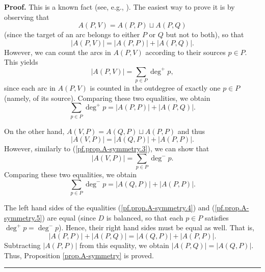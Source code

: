 \documentclass[numbers=enddot,12pt,final,onecolumn,notitlepage]{scrartcl}%
\theoremstyle{definition}
\newenvironment{proof}[1][Proof]{\noindent\textbf{#1.} }{\ \rule{0.5em}{0.5em}}
\let\sumnonlimits\sum
\renewcommand{\sum}{\sumnonlimits\limits}
\theoremstyle{plainsl}
\begin{document}
\begin{proof}
This is a known fact (see, e.g., \cite[Exercise 9.1]{22s}). The easiest way to
prove it is by observing that%
\[
A\left(  P,V\right)  =A\left(  P,P\right)  \sqcup A\left(  P,Q\right)
\]
(since the target of an arc belongs to either $P$ or $Q$ but not to both), so
that%
\[
\left\vert A\left(  P,V\right)  \right\vert =\left\vert A\left(  P,P\right)
\right\vert +\left\vert A\left(  P,Q\right)  \right\vert .
\]
However, we can count the arcs in $A\left(  P,V\right)  $ according to their
sources $p\in P$. This yields%
\begin{equation}
\left\vert A\left(  P,V\right)  \right\vert =\sum_{p\in P}\deg^{+}p,
\label{pf.prop.A-symmetry.3}%
\end{equation}
since each arc in $A\left(  P,V\right)  $ is counted in the outdegree of
exactly one $p\in P$ (namely, of its source). Comparing these two equalities,
we obtain%
\begin{equation}
\sum_{p\in P}\deg^{+}p=\left\vert A\left(  P,P\right)  \right\vert +\left\vert
A\left(  P,Q\right)  \right\vert . \label{pf.prop.A-symmetry.4}%
\end{equation}


On the other hand, $A\left(  V,P\right)  =A\left(  Q,P\right)  \sqcup A\left(
P,P\right)  $ and thus%
\[
\left\vert A\left(  V,P\right)  \right\vert =\left\vert A\left(  Q,P\right)
\right\vert +\left\vert A\left(  P,P\right)  \right\vert .
\]
However, similarly to (\ref{pf.prop.A-symmetry.3}), we can show that%
\[
\left\vert A\left(  V,P\right)  \right\vert =\sum_{p\in P}\deg^{-}p.
\]
Comparing these two equalities, we obtain%
\begin{equation}
\sum_{p\in P}\deg^{-}p=\left\vert A\left(  Q,P\right)  \right\vert +\left\vert
A\left(  P,P\right)  \right\vert . \label{pf.prop.A-symmetry.5}%
\end{equation}


The left hand sides of the equalities (\ref{pf.prop.A-symmetry.4}) and
(\ref{pf.prop.A-symmetry.5}) are equal (since $D$ is balanced, so that each
$p\in P$ satisfies $\deg^{+}p=\deg^{-}p$). Hence, their right hand sides must
be equal as well. That is,%
\[
\left\vert A\left(  P,P\right)  \right\vert +\left\vert A\left(  P,Q\right)
\right\vert =\left\vert A\left(  Q,P\right)  \right\vert +\left\vert A\left(
P,P\right)  \right\vert .
\]
Subtracting $\left\vert A\left(  P,P\right)  \right\vert $ from this equality,
we obtain $\left\vert A\left(  P,Q\right)  \right\vert =\left\vert A\left(
Q,P\right)  \right\vert $. Thus, Proposition \ref{prop.A-symmetry} is proved.
\end{proof}
\end{document}
